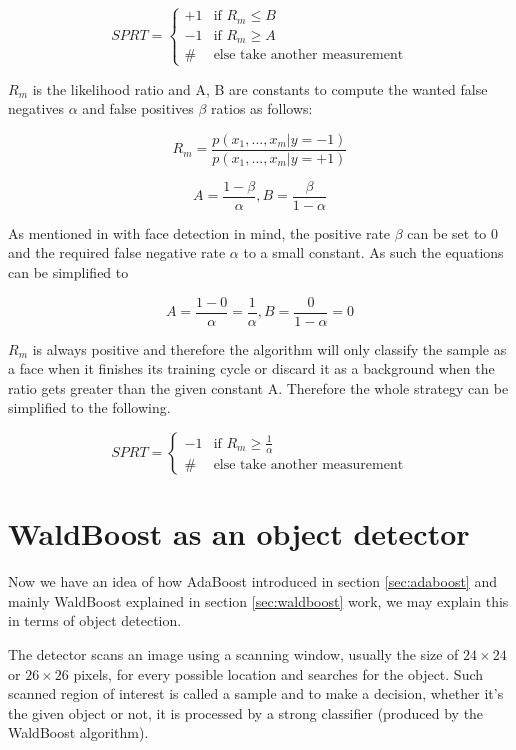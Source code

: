 \[
 SPRT =
  \begin{cases}
   +1 & \text{if } R_{m} \leq B \\
   -1 & \text{if } R_{m} \geq A \\
   \# & \text{else take another measurement} 
  \end{cases}
\]

$R_{m}$ is the likelihood ratio and A, B are constants to compute the wanted false negatives $\alpha$ and false positives $\beta$ ratios as follows:

\begin{equation}
R_{m}=\frac{p(x_{1}, ..., x_{m}|y=-1)}{p(x_{1}, ..., x_{m}|y=+1)}
\end{equation}

\begin{equation}
A=\frac{1-\beta}{\alpha}, B=\frac{\beta}{1-\alpha}
\end{equation}

As mentioned in \cite{sochman2005waldboost} with face detection in mind, the positive rate $\beta$ can be set to 0 and the required false negative rate $\alpha$ to a small constant. As such the equations can be simplified to

\begin{equation}
A=\frac{1-0}{\alpha}=\frac{1}{\alpha}, B=\frac{0}{1-\alpha}=0
\end{equation}\label{eq:const-a}

$R_{m}$ is always positive and therefore the algorithm will only classify the sample as a face when it finishes its training cycle or discard it as a background when the ratio gets greater than the given constant A. Therefore the whole strategy can be simplified to the following.

\[
 SPRT =
  \begin{cases}
   -1 & \text{if } R_{m} \geq \frac{1}{\alpha} \\
   \# & \text{else take another measurement} 
  \end{cases}
\]

\section{WaldBoost as an object detector}

Now we have an idea of how AdaBoost introduced in section \ref{sec:adaboost} and mainly WaldBoost explained in section \ref{sec:waldboost} work, we may explain this in terms of object detection.

The detector scans an image using a scanning window, usually the size of $24 \times 24$ or $26 \times 26$ pixels, for every possible location and searches for the object. Such scanned region of interest is called a sample and to make a decision, whether it's the given object or not, it is processed by a strong classifier (produced by the WaldBoost algorithm).

